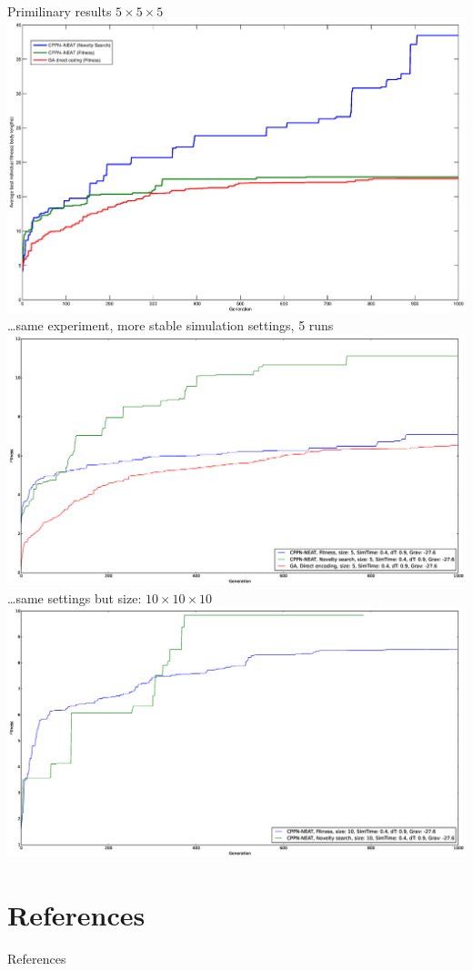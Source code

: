 \documentclass{beamer}
\begin{document}
\begin{frame}[allowframebreaks]{Primilinary results}
$5 \times 5 \times 5$
\includegraphics[width=1.0\textwidth,height=0.8\textheight]{figures/noveltyFitnessDirect.eps}\\
\newpage
\ldots same experiment, more stable simulation settings, 5 runs
\includegraphics[width=1.0\textwidth,height=0.8\textheight]{figures/noveltyFitnessDirect2.eps}
\newpage
\ldots same settings but size: $10 \times 10 \times 10$
\includegraphics[width=1.0\textwidth,height=0.8\textheight]{figures/noveltyFitnessDirect10_uncompleted.eps}
\end{frame}



\section{References}

\begin{frame}[allowframebreaks]{References}


\end{frame}
\end{document}
